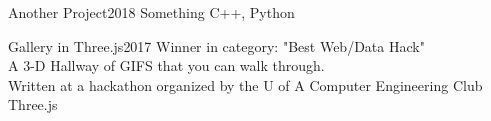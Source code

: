 
				


%
%
%


\begin{projects}
    \project
    {Another Project}{2018}
    {}
    {Something}
    {C++, Python}

	\project
	{Gallery in Three.js}{2017}
	{}
	{
            Winner in category: "Best Web/Data Hack"\\
            A 3-D Hallway of GIFS that you can walk through.\\
            Written at a hackathon organized by the U of A Computer Engineering Club 
    }
    {Three.js}
				

\end{projects}
